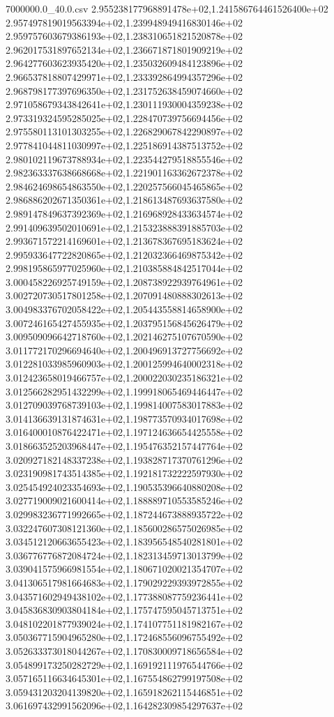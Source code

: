 \begin{filecontents*}{7000000.0_40.0.csv}
2.955238177968891478e+02,1.241586764461526400e+02
2.957497819019563394e+02,1.239948949416830146e+02
2.959757603679386193e+02,1.238310651821520878e+02
2.962017531897652134e+02,1.236671871801909219e+02
2.964277603623935420e+02,1.235032609484123896e+02
2.966537818807429971e+02,1.233392864994357296e+02
2.968798177397696350e+02,1.231752638459074660e+02
2.971058679343842641e+02,1.230111930004359238e+02
2.973319324595285025e+02,1.228470739756694456e+02
2.975580113101303255e+02,1.226829067842290897e+02
2.977841044811030997e+02,1.225186914387513752e+02
2.980102119673788934e+02,1.223544279518855546e+02
2.982363337638668668e+02,1.221901163362672378e+02
2.984624698654863550e+02,1.220257566045465865e+02
2.986886202671350361e+02,1.218613487693637580e+02
2.989147849637392369e+02,1.216968928433634574e+02
2.991409639502010691e+02,1.215323888391885703e+02
2.993671572214169601e+02,1.213678367695183624e+02
2.995933647722820865e+02,1.212032366469875342e+02
2.998195865977025960e+02,1.210385884842517044e+02
3.000458226925749159e+02,1.208738922939764961e+02
3.002720730517801258e+02,1.207091480888302613e+02
3.004983376702058422e+02,1.205443558814658900e+02
3.007246165427455935e+02,1.203795156845626479e+02
3.009509096642718760e+02,1.202146275107670590e+02
3.011772170296694640e+02,1.200496913727756692e+02
3.012281033985960903e+02,1.200125994640002318e+02
3.012423658019466757e+02,1.200022030235186321e+02
3.012566282951432299e+02,1.199918065469446447e+02
3.012709039768739103e+02,1.199814007583017883e+02
3.014136639131874631e+02,1.198773570934017698e+02
3.016400010876422471e+02,1.197124636654425558e+02
3.018663525203968447e+02,1.195476352157447764e+02
3.020927182148337238e+02,1.193828717370761296e+02
3.023190981743514385e+02,1.192181732222597930e+02
3.025454924023354693e+02,1.190535396640880208e+02
3.027719009021600414e+02,1.188889710553585246e+02
3.029983236771992665e+02,1.187244673888935722e+02
3.032247607308121360e+02,1.185600286575026985e+02
3.034512120663655423e+02,1.183956548540281801e+02
3.036776776872084724e+02,1.182313459713013799e+02
3.039041575966981554e+02,1.180671020021354707e+02
3.041306517981664683e+02,1.179029229393972855e+02
3.043571602949438102e+02,1.177388087759236441e+02
3.045836830903804184e+02,1.175747595045713751e+02
3.048102201877939024e+02,1.174107751181982167e+02
3.050367715904965280e+02,1.172468556096755492e+02
3.052633373018044267e+02,1.170830009718656584e+02
3.054899173250282729e+02,1.169192111976544766e+02
3.057165116634645301e+02,1.167554862799197508e+02
3.059431203204139820e+02,1.165918262115446851e+02
3.061697432991562096e+02,1.164282309854297637e+02

\end{filecontents*}
